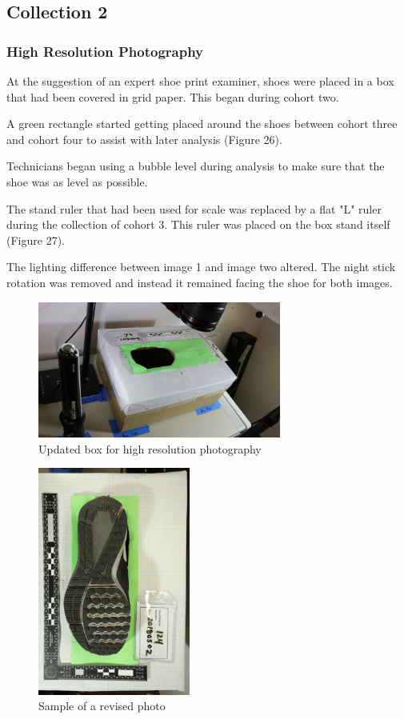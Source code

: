 \newpage


\subsection{Collection 2}

\subsubsection{High Resolution Photography}
At the suggestion of an expert shoe print examiner, shoes were placed in a box that had been covered in grid paper. This began during cohort two.

A green rectangle started getting placed around the shoes between cohort three and cohort four to assist with later analysis (Figure 26). 

Technicians began using a bubble level during analysis to make sure that the shoe was as level as possible. 

The stand ruler that had been used for scale was replaced by a flat "L" ruler during the collection of cohort 3. This ruler was placed on the box stand itself (Figure 27). 

The lighting difference between image 1 and image two altered. The night stick rotation was removed and instead it remained facing the shoe for both images.

\begin{figure}[!htp]
\centering
\includegraphics[width=8cm]{New_Box}
\caption{Updated box for high resolution photography}
\label{Image 26}
\end{figure}

\begin{figure}[!htp]
\centering
\includegraphics[width=5cm]{New_Photo}
\caption{Sample of a revised photo }
\label{Image 27}
\end{figure}

